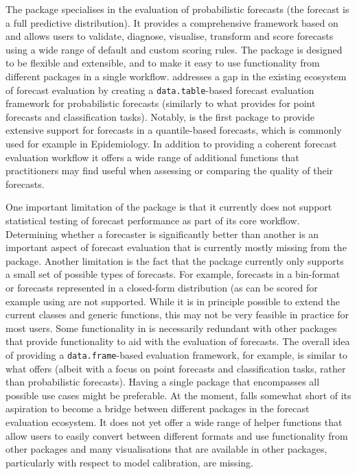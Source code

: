 \documentclass[
]{jss}
\begin{document}
The package specialises in the evaluation of probabilistic forecasts
(the forecast is a full predictive distribution). It provides a
comprehensive framework based on  and allows users to
validate, diagnose, visualise, transform and score forecasts using a
wide range of default and custom scoring rules. The package is designed
to be flexible and extensible, and to make it easy to use functionality
from different packages in a single workflow. 
addresses a gap in the existing ecosystem of forecast evaluation by
creating a \texttt{data.table}-based forecast evaluation framework for
probabilistic forecasts (similarly to what  provides for
point forecasts and classification tasks). Notably, 
is the first package to provide extensive support for forecasts in a
quantile-based forecasts, which is commonly used for example in
Epidemiology. In addition to providing a coherent forecast evaluation
workflow it offers a wide range of additional functions that
practitioners may find useful when assessing or comparing the quality of
their forecasts.

One important limitation of the package is that it currently does not
support statistical testing of forecast performance as part of its core
workflow. Determining whether a forecaster is significantly better than
another is an important aspect of forecast evaluation that is currently
mostly missing from the package. Another limitation is the fact that the
package currently only supports a small set of possible types of
forecasts. For example, forecasts in a bin-format or forecasts
represented in a closed-form distribution (as can be scored for example
using  are not supported. While it is in principle
possible to extend the current classes and generic functions, this may
not be very feasible in practice for most users. Some functionality in
 is necessarily redundant with other packages that
provide functionality to aid with the evaluation of forecasts. The
overall idea of providing a \texttt{data.frame}-based evaluation
framework, for example, is similar to what  offers
(albeit with a focus on point forecasts and classification tasks, rather
than probabilistic forecasts). Having a single package that encompasses
all possible use cases might be preferable. At the moment,
 falls somewhat short of its aspiration to become a
bridge between different packages in the forecast evaluation ecosystem.
It does not yet offer a wide range of helper functions that allow users
to easily convert between different formats and use functionality from
other packages and many visualisations that are available in other
packages, particularly with respect to model calibration, are missing.
\end{document}

